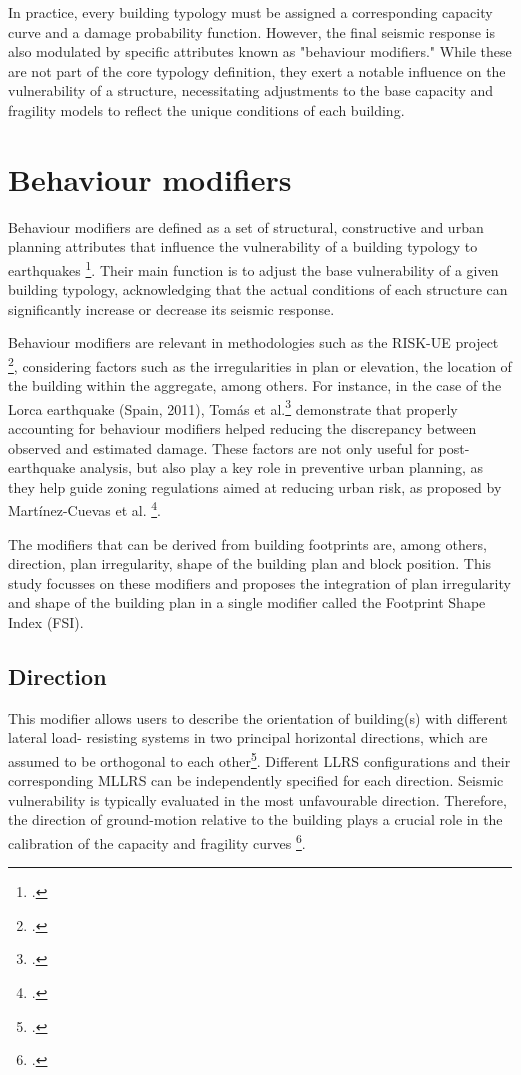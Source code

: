 \begin{refsection}
In practice, every building typology must be assigned a corresponding capacity curve and a damage probability function. However, the final seismic response is also modulated by specific attributes known as "behaviour modifiers." While these are not part of the core typology definition, they exert a notable influence on the vulnerability of a structure, necessitating adjustments to the base capacity and fragility models to reflect the unique conditions of each building.

\renewcommand{\sectionnametext}{Behaviour modifiers}
\renewcommand{\headingtextR}{\thesection. \sectionnametext}
\section{\sectionnametext}


Behaviour modifiers are defined as a set of structural, constructive and urban planning attributes that influence the vulnerability of a building typology to earthquakes  \footcite{martinez-cuevas_urban_2017}. Their main function is to adjust the base vulnerability of a given building typology, acknowledging that the actual conditions of each structure can significantly increase or decrease its seismic response.


Behaviour modifiers are relevant in methodologies such as the RISK-UE project \footcite{milutinovic_riskue_wp4_2003}, considering factors such as the irregularities in plan or elevation, the location of the building within the aggregate, among others. For instance, in the case of the Lorca earthquake (Spain, 2011),  Tomás et al.\footcite{tomas_proposal_2017} demonstrate that properly accounting for behaviour modifiers helped reducing the discrepancy between observed and estimated damage.
These factors are not only useful for post-earthquake analysis, but also play a key role in preventive urban planning, as they help guide zoning regulations aimed at reducing urban risk, as proposed by Martínez-Cuevas et al. \footcite{martinez-cuevas_urban_2017}.

The modifiers that can be derived from building footprints are, among others, direction, plan irregularity, shape of the building plan and block position. This study focusses on these modifiers and proposes the integration of plan irregularity and shape of the building plan in a single modifier called the Footprint Shape Index (FSI).

\subsection{Direction}
This modifier allows users to describe the orientation of building(s) with different lateral load- resisting systems in two principal horizontal directions, which are assumed to be orthogonal to each other\footcite{brzev_gem_2013}. Different LLRS configurations and their corresponding MLLRS can be independently specified for each direction. Seismic vulnerability is typically evaluated in the most unfavourable direction. Therefore, the direction of ground-motion relative to the building plays a crucial role in the calibration of the capacity and fragility curves \footcite{zucconi_fragility_2022}.


\end{refsection}
